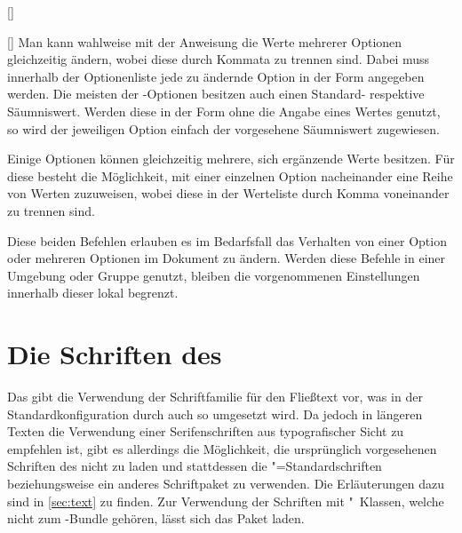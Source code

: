 \begin{Declaration*}{}
\begin{Declaration*}{}
\begin{Declaration*}{}
\begin{Declaration}{[]}
\begin{Declaration}{[]}
Man kann wahlweise mit der Anweisung  die Werte mehrerer 
Optionen gleichzeitig ändern, wobei diese durch Kommata zu trennen sind. Dabei 
muss innerhalb der Optionenliste jede zu ändernde Option in der Form 
\PValue{=} angegeben werden. Die meisten der 
\TUDScript-Optionen besitzen auch einen Standard- respektive Säumniswert. 
Werden diese in der Form  ohne die Angabe eines Wertes genutzt, 
so wird der jeweiligen Option einfach der vorgesehene Säumniswert zugewiesen.

Einige Optionen können gleichzeitig mehrere, sich ergänzende Werte besitzen. 
Für diese besteht die Möglichkeit, mit  einer einzelnen Option 
nacheinander eine Reihe von Werten zuzuweisen, wobei diese in der Werteliste 
durch Komma voneinander zu trennen sind.

Diese beiden Befehlen erlauben es im Bedarfsfall das Verhalten von einer Option 
oder mehreren Optionen im Dokument zu ändern. Werden diese Befehle in einer 
Umgebung oder Gruppe genutzt, bleiben die vorgenommenen Einstellungen innerhalb 
dieser lokal begrenzt.
\end{Declaration}
\end{Declaration}



\section{Die Schriften des \CDs}
%
%
%
%
Das \TUDCD gibt die Verwendung der Schriftfamilie \OpenSans für den Fließtext 
vor, was in der Standardkonfiguration durch \TUDScript auch so umgesetzt wird. 
Da jedoch in längeren Texten die Verwendung einer Serifenschriften aus 
typografischer Sicht zu empfehlen ist, gibt es allerdings die Möglichkeit, die 
ursprünglich vorgesehenen Schriften des \CDs nicht zu laden und stattdessen die 
"=Standardschriften beziehungsweise ein anderes Schriftpaket zu 
verwenden. Die Erläuterungen dazu sind in \autoref{sec:text} zu finden. Zur 
Verwendung der Schriften mit "~Klassen, welche nicht zum 
\TUDScript-Bundle gehören, lässt sich das Paket  laden.


\end{Declaration*}
\end{Declaration*}
\end{Declaration*}
